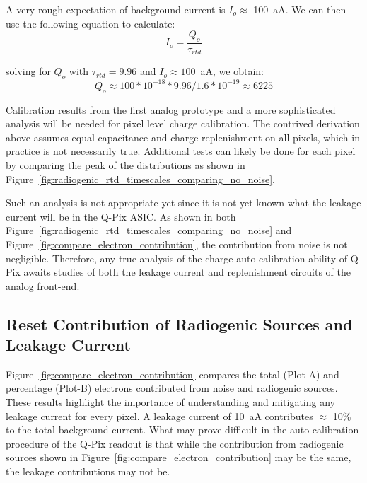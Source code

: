 A very rough expectation of background current is $I_o \approx$ 100~\unit{aA}.
We can then use the following equation to calculate:
$$
I_{o} = \frac{Q_{o}}{\tau_{rtd}}
$$

solving for $Q_{o}$ with $\tau_{rtd} = 9.96$ and $I_{o} \approx 100$~\unit{aA}, we obtain:
$$
Q_{o} \approx 100*10^{-18} * 9.96 / 1.6*10^{-19} \approx 6225
$$

Calibration results from the first analog prototype and a more sophisticated analysis will be needed for pixel level charge calibration.
The contrived derivation above assumes equal capacitance and charge replenishment on all pixels, which in practice is not necessarily true.
Additional tests can likely be done for each pixel by comparing the peak of the distributions as shown in Figure~\ref{fig:radiogenic_rtd_timescales_comparing_no_noise}.

Such an analysis is not appropriate yet since it is not yet known what the leakage current will be in the Q-Pix ASIC.
As shown in both Figure~\ref{fig:radiogenic_rtd_timescales_comparing_no_noise} and Figure~\ref{fig:compare_electron_contribution}, the contribution from noise is not negligible.
Therefore, any true analysis of the charge auto-calibration ability of Q-Pix awaits studies of both the leakage current and replenishment circuits of the analog front-end.

\subsection{Reset Contribution of Radiogenic Sources and Leakage Current}

Figure~\ref{fig:compare_electron_contribution} compares the total (Plot-A) and percentage (Plot-B) electrons contributed from noise and radiogenic sources.
These results highlight the importance of understanding and mitigating any leakage current for every pixel.
A leakage current of 10~\unit{aA} contributes $\approx$ 10\% to the total background current.
What may prove difficult in the auto-calibration procedure of the Q-Pix readout is that while the contribution from radiogenic sources shown in Figure~\ref{fig:compare_electron_contribution} may be the same, the leakage contributions may not be.

